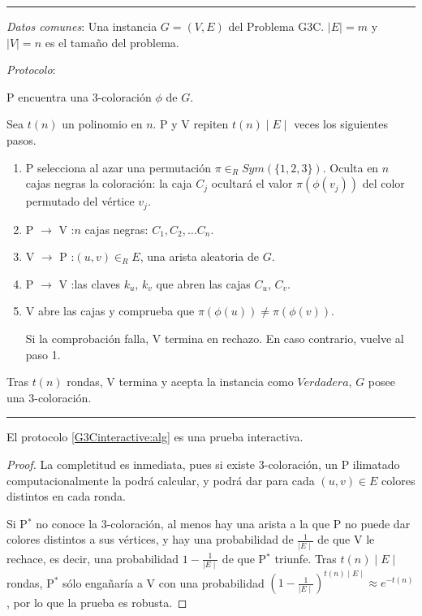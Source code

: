 \rule{\textwidth}{1pt}
\begin{algorithm}
	
	\hfil
	
	\textit{Datos comunes}: Una instancia $G=(V,E)$ del Problema G3C.  $\mid E \mid=m$ y $\mid V \mid = n$ es el tamaño del problema.
	
	\textit{Protocolo}: 
	
	P encuentra una 3-coloración $\phi$ de $G$.
	
	Sea $t(n)$ un polinomio en $n$. P y V repiten $t(n)\mid E \mid$ veces los siguientes pasos.
	
	\begin{enumerate}
		
		\item P selecciona al azar una permutación $\pi \in_R Sym(\{1,2,3\})$. Oculta en $n$ cajas negras la coloración: la caja $C_j$ ocultará el valor $\pi(\phi(v_j))$ del color permutado del vértice $v_j$.
		
		\item P $\rightarrow$ V :\quad $n$ cajas negras: $C_1, C_2, \dots C_n$.
		
		\item V $\rightarrow$ P :\quad $(u,v) \in_R E$, una arista aleatoria de $G$.
		
		\item P $\rightarrow$ V :\quad las claves $k_u$, $k_v$ que abren las cajas $C_u$, $C_v$.
		
		\item V abre las cajas y comprueba que $\pi(\phi(u)) \neq \pi(\phi(v))$.
		
		Si la comprobación falla, V termina en rechazo. En caso contrario, vuelve al paso 1.
		
		
	\end{enumerate}
	
	Tras $t(n)$ rondas, V termina y acepta la instancia como $Verdadera$, $G$ posee una 3-coloración.
	\label{G3Cinteractive:alg}
\end{algorithm}
\rule{\textwidth}{1pt}

\hfil



\begin{theorem}
	El protocolo \ref{G3Cinteractive:alg} es una prueba interactiva.
\end{theorem}

\begin{proof}
	La completitud es inmediata, pues si existe 3-coloración, un P ilimatado computacionalmente la podrá calcular, y podrá dar para cada $(u,v)\in E$ colores distintos en cada ronda.
	
	Si P$^*$ no conoce la 3-coloración, al menos hay una arista a la que P no puede dar colores distintos a sus vértices, y hay una probabilidad de $\frac{1}{\mid E \mid}$ de que V le rechace, es decir, una probabilidad $1-\frac{1}{\mid E \mid}$ de que P$^*$ triunfe. Tras $t(n)\mid E \mid$ rondas, P$^*$ sólo engañaría a V con una probabilidad $(1-\frac{1}{\mid E \mid})^{t(n)\mid E \mid} \approx e^{-t(n)}$, por lo que la prueba es robusta.
	
\end{proof}


